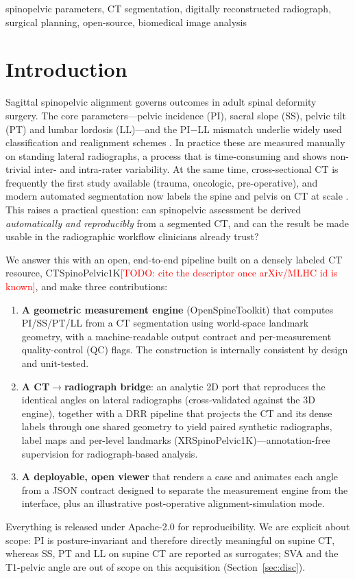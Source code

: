 \documentclass[conference]{IEEEtran}
\newcommand{\TODO}[1]{\textcolor{red}{[TODO: #1]}}
\newcommand{\dataset}{CTSpinoPelvic1K}
\newcommand{\xrdataset}{XRSpinoPelvic1K}
\newcommand{\ostk}{OpenSpineToolkit}
\begin{document}
\begin{IEEEkeywords}
spinopelvic parameters, CT segmentation, digitally reconstructed radiograph, surgical
planning, open-source, biomedical image analysis
\end{IEEEkeywords}

\section{Introduction}
Sagittal spinopelvic alignment governs outcomes in adult spinal deformity surgery.
The core parameters---pelvic incidence (PI), sacral slope (SS), pelvic tilt (PT) and
lumbar lordosis (LL)---and the PI$-$LL mismatch underlie widely used classification and
realignment schemes \cite{schwab2012,lafage2016}. In practice these are measured manually
on standing lateral radiographs, a process that is time-consuming and shows non-trivial
inter- and intra-rater variability. At the same time, cross-sectional CT is frequently the
first study available (trauma, oncologic, pre-operative), and modern automated
segmentation now labels the spine and pelvis on CT at scale
\cite{verse,totalsegmentator}. This raises a practical question: can spinopelvic
assessment be derived \emph{automatically and reproducibly} from a segmented CT, and can
the result be made usable in the radiographic workflow clinicians already trust?

We answer this with an open, end-to-end pipeline built on a densely labeled CT resource,
\dataset{}\TODO{cite the descriptor once arXiv/MLHC id is known}, and make three
contributions:
\begin{enumerate}
\item \textbf{A geometric measurement engine} (\ostk) that computes PI/SS/PT/LL from a CT
segmentation using world-space landmark geometry, with a machine-readable output contract
and per-measurement quality-control (QC) flags. The construction is internally consistent
by design and unit-tested.
\item \textbf{A CT$\rightarrow$radiograph bridge}: an analytic 2D port that reproduces the
identical angles on lateral radiographs (cross-validated against the 3D engine), together
with a DRR pipeline that projects the CT and its dense labels through one shared geometry
to yield paired synthetic radiographs, label maps and per-level landmarks
(\xrdataset)---annotation-free supervision for radiograph-based analysis.
\item \textbf{A deployable, open viewer} that renders a case and animates each angle from a
JSON contract designed to separate the measurement engine from the interface, plus an
illustrative post-operative alignment-simulation mode.
\end{enumerate}
Everything is released under Apache-2.0 for reproducibility. We are explicit about scope:
PI is posture-invariant and therefore directly meaningful on supine CT, whereas SS, PT and
LL on supine CT are reported as surrogates; SVA and the T1-pelvic angle are out of scope on
this acquisition (Section~\ref{sec:disc}).
\end{document}
